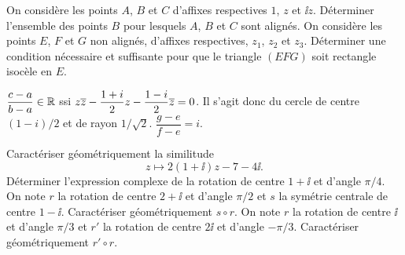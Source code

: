 \documentclass{magnolia}
\begin{document}
\begin{questions}
\question On considère les points $A$, $B$ et $C$ d'affixes respectives $1$, $z$ et $\ii z$. Déterminer l'ensemble des points $B$ pour lesquels $A$, $B$ et $C$ sont alignés.
\question On considère les points $E$, $F$ et $G$ non alignés, d'affixes respectives, $z_{1}$, $z_{2}$ et $z_{3}$. Déterminer une condition nécessaire et suffisante pour que le triangle $(EFG)$ soit rectangle isocèle en $E$.
\end{questions}
\begin{sol}
\begin{questions}
\question $\dfrac {c-a}{b-a}\in \mathbb{R}$ ssi $z\overline{z}-\dfrac{1+i}{2}z-\dfrac{1-i}{2}\overline{z}=0$. Il s'agit donc du cercle de centre $(1-i)/2$ et de rayon $1/\sqrt 2$.
\question $\dfrac{g-e}{f-e}=i$.
\end{questions}
\end{sol}


\begin{questions}
\question Caractériser géométriquement la similitude
  \[z\mapsto 2(1+\ii)z-7-4\ii.\]
\question Déterminer l'expression complexe de la rotation de centre $1+\ii$ et d'angle $\pi/4$.
\question On note $r$ la rotation de centre $2+\ii$ et d'angle $\pi/2$ et $s$ la symétrie centrale de centre $1-\ii$. Caractériser géométriquement $s\circ r$.
\question On note $r$ la rotation de centre $\ii$ et d'angle $\pi/3$ et $r'$ la rotation de centre $2\ii$ et d'angle $-\pi/3$. Caractériser géométriquement $r'\circ r$.
\end{questions}
\end{document}
